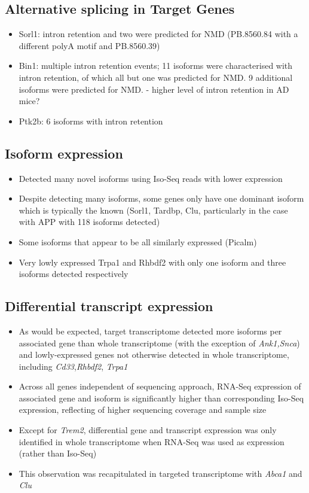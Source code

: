 \subsection{Alternative splicing in Target Genes}
\begin{itemize}
	\item Sorl1: intron retention and two were predicted for NMD (PB.8560.84 with a different polyA motif and PB.8560.39)
	\item Bin1: multiple intron retention events; 11 isoforms were characterised with intron retention, of which all but one was predicted for NMD. 9 additional isoforms were predicted for NMD. - higher level of intron retention in AD mice?
	\item Ptk2b: 6 isoforms with intron retention
\end{itemize}


\subsection{Isoform expression}
\begin{itemize}
	\item Detected many novel isoforms using Iso-Seq reads with lower expression
	\item Despite detecting many isoforms, some genes only have one dominant isoform which is typically the known (Sorl1, Tardbp, Clu, particularly in the case with APP with 118 isoforms detected)
	\item Some isoforms that appear to be all similarly expressed (Picalm)
	\item Very lowly expressed Trpa1 and Rhbdf2 with only one isoform and three isoforms detected respectively
\end{itemize}

\subsection{Differential transcript expression}

\begin{itemize}
	\item As would be expected, target transcriptome detected more isoforms per associated gene than whole transcriptome (with the exception of \textit{Ank1,Snca}) and lowly-expressed genes not otherwise detected in whole transcriptome, including \textit{Cd33},\textit{Rhbdf2}, \textit{Trpa1}
	\item Across all genes independent of sequencing approach, RNA-Seq expression of associated gene and isoform is significantly higher than corresponding Iso-Seq expression, reflecting of higher sequencing coverage and sample size 
	\item Except for \textit{Trem2}, differential gene and transcript expression was only identified in whole transcriptome when RNA-Seq was used as expression (rather than Iso-Seq)
	\item This observation was recapitulated in targeted transcriptome with \textit{Abca1} and \textit{Clu}
\end{itemize}

